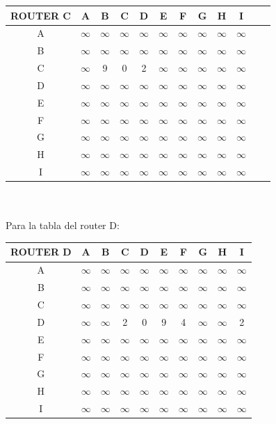 \documentclass{article}
\begin{document}
\begin{tabular}{ | c | c | c | c | c | c | c | c | c | c | c | c |}
\hline                 
ROUTER C    & A      & B      & C      & D      & E      & F      & G      & H      & I      \\
\hline
        A   &$\infty$&$\infty$&$\infty$&$\infty$&$\infty$&$\infty$&$\infty$&$\infty$&$\infty$\\
\hline
        B   &$\infty$&$\infty$&$\infty$&$\infty$&$\infty$&$\infty$&$\infty$&$\infty$&$\infty$\\
\hline
        C   &$\infty$& 9      & 0      & 2      &$\infty$&$\infty$&$\infty$&$\infty$&$\infty$\\
\hline
        D   &$\infty$&$\infty$&$\infty$&$\infty$&$\infty$&$\infty$&$\infty$&$\infty$&$\infty$\\
\hline
        E   &$\infty$&$\infty$&$\infty$&$\infty$&$\infty$&$\infty$&$\infty$&$\infty$&$\infty$\\
\hline
        F   &$\infty$&$\infty$&$\infty$&$\infty$&$\infty$&$\infty$&$\infty$&$\infty$&$\infty$\\
\hline
        G   &$\infty$&$\infty$&$\infty$&$\infty$&$\infty$&$\infty$&$\infty$&$\infty$&$\infty$\\
\hline
        H   &$\infty$&$\infty$&$\infty$&$\infty$&$\infty$&$\infty$&$\infty$&$\infty$&$\infty$\\
\hline 
        I   &$\infty$&$\infty$&$\infty$&$\infty$&$\infty$&$\infty$&$\infty$&$\infty$&$\infty$\\
\hline
\end{tabular}
\\\\
\clearpage
Para la tabla del router D:\\
\begin{tabular}{ | c | c | c | c | c | c | c | c | c | c |}
\hline                 
ROUTER D    & A      & B      & C      & D      & E      & F      & G      & H      & I      \\
\hline
        A   &$\infty$&$\infty$&$\infty$&$\infty$&$\infty$&$\infty$&$\infty$&$\infty$&$\infty$\\
\hline
        B   &$\infty$&$\infty$&$\infty$&$\infty$&$\infty$&$\infty$&$\infty$&$\infty$&$\infty$\\
\hline
        C   &$\infty$&$\infty$&$\infty$&$\infty$&$\infty$&$\infty$&$\infty$&$\infty$&$\infty$\\
\hline
        D   &$\infty$&$\infty$& 2      & 0      & 9      & 4      &$\infty$&$\infty$& 2      \\
\hline
        E   &$\infty$&$\infty$&$\infty$&$\infty$&$\infty$&$\infty$&$\infty$&$\infty$&$\infty$\\
\hline
        F   &$\infty$&$\infty$&$\infty$&$\infty$&$\infty$&$\infty$&$\infty$&$\infty$&$\infty$\\
\hline
        G   &$\infty$&$\infty$&$\infty$&$\infty$&$\infty$&$\infty$&$\infty$&$\infty$&$\infty$\\
\hline
        H   &$\infty$&$\infty$&$\infty$&$\infty$&$\infty$&$\infty$&$\infty$&$\infty$&$\infty$\\
\hline 
        I   &$\infty$&$\infty$&$\infty$&$\infty$&$\infty$&$\infty$&$\infty$&$\infty$&$\infty$\\
\hline
\end{tabular}
\end{document}
